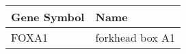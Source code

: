 \begin{tabular}{ll}
\toprule
Gene Symbol &            Name \\
\midrule
      FOXA1 & forkhead box A1 \\
\bottomrule
\end{tabular}

